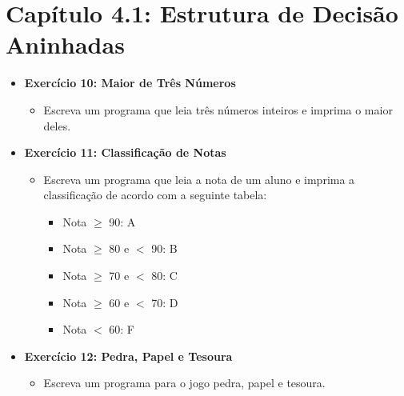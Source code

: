 \documentclass{article}
\begin{document}
\section*{Capítulo 4.1: Estrutura de Decisão Aninhadas}
    \begin{itemize}
        \item \textbf{Exercício 10: Maior de Três Números}
        \begin{itemize}
            \item Escreva um programa que leia três números inteiros e imprima o maior deles.
        \end{itemize}
        \item \textbf{Exercício 11: Classificação de Notas}
        \begin{itemize}
            \item Escreva um programa que leia a nota de um aluno e imprima a classificação de acordo com a seguinte tabela:
            \begin{itemize}
                \item Nota \(\geq\) 90: A
                \item Nota \(\geq\) 80 e $<$ 90: B
                \item Nota \(\geq\) 70 e $<$ 80: C
                \item Nota \(\geq\) 60 e $<$ 70: D
                \item Nota $<$ 60: F
            \end{itemize}
        \end{itemize}
        \item \textbf{Exercício 12: Pedra, Papel e Tesoura}
        \begin{itemize}
            \item Escreva um programa para o jogo pedra, papel e tesoura.
        \end{itemize}
    \end{itemize}
\end{document}
